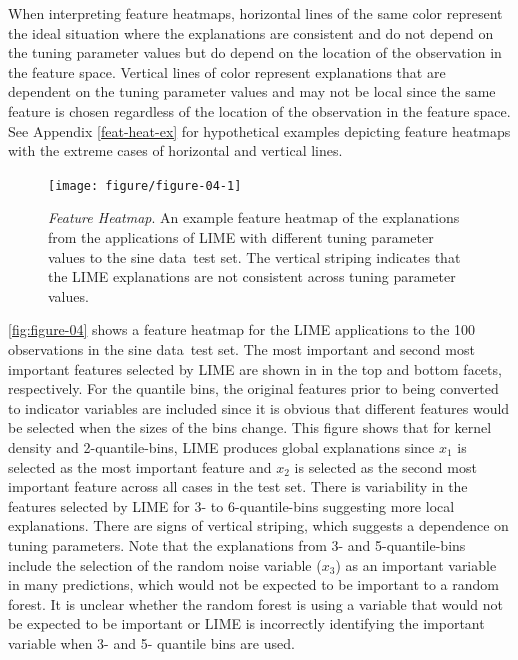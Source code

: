 \documentclass[AMS,STIX2COL]{WileyNJD-v2}\usepackage[]{graphicx}\usepackage[]{color}
\newenvironment{knitrout}{}{} %
\newcommand{\data}{sine data}
\begin{document}
When interpreting feature heatmaps, horizontal lines of the same color represent the ideal situation where the explanations are consistent and do not depend on the tuning parameter values but do depend on the location of the observation in the feature space. Vertical lines of color represent explanations that are dependent on the tuning parameter values and may not be local since the same feature is chosen regardless of the location of the observation in the feature space. See Appendix \ref{feat-heat-ex} for hypothetical examples depicting feature heatmaps with the extreme cases of horizontal and vertical lines.

\begin{figure}[!tp]
\begin{knitrout}
\color{fgcolor}

{\centering \texttt{[image: figure/figure-04-1]} 

}



\end{knitrout}
\caption{\emph{Feature Heatmap}. An example feature heatmap of the explanations from the applications of LIME with different tuning parameter values to the \data \ test set.  The vertical striping indicates that the LIME explanations are not consistent across tuning parameter values.}
\label{fig:figure-04}
\end{figure}



\autoref{fig:figure-04} shows a feature heatmap for the LIME applications to the 100 observations in the \data \ test set. The most important and second most important features selected by LIME are shown in in the top and bottom facets, respectively. For the quantile bins, the original features prior to being converted to indicator variables  are included since it is obvious that different features would be selected when the sizes of the bins change. This figure shows that for kernel density and 2-quantile-bins, LIME produces global explanations since  $x_1$ is selected as the most important feature and $x_2$ is selected as the second most important feature across all cases in the test set.  There is variability in the features selected by LIME for 3- to 6-quantile-bins suggesting more local explanations. There are signs of vertical striping, which suggests a dependence on tuning parameters. Note that the explanations from 3- and 5-quantile-bins include the selection of the random noise variable ($x_3$) as an important variable in many predictions, which would not be expected to be important to a random forest. It is unclear whether the random forest is using a variable that would not be expected to be important or LIME is incorrectly identifying the important variable when 3- and 5- quantile bins are used.
\end{document}
